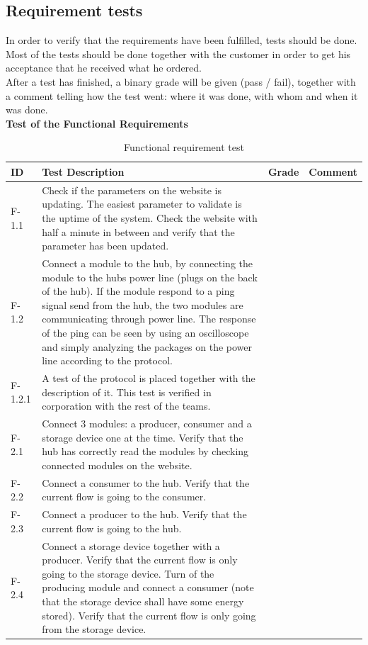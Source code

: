 \subsection{Requirement tests}
In order to verify that the requirements have been fulfilled, tests should be done. Most of the tests should be done together with the customer in order to get his acceptance that he received what he ordered. 
\\After a test has finished, a binary grade will be given (pass / fail), together with a comment telling how the test went: where it was done, with whom and when it was done.
\\[0.2cm]\textbf{Test of the Functional Requirements}
\begin{table}[H]
	\begin{tabular} [b] {| p{1.2cm} |  p{9.3cm} | p{1.2cm} | p{3.8cm} |}
	\hline
	\textbf{ID} & \textbf{Test Description} & \textbf{Grade} & \textbf{Comment} \\\hline
		F-1.1 	& Check if the parameters on the website is updating. The easiest parameter to validate is the uptime of the system. Check the website with half a minute in between and verify that the parameter has been updated. 	&	&\\ \hline
		F-1.2 	& Connect a module to the hub, by connecting the module to the hubs power line (plugs on the back of the hub). If the module respond to a ping signal send from the hub, the two modules are communicating through power line. The response of the ping can be seen by using an oscilloscope and simply analyzing the packages on the power line according to the protocol. 	&	&\\ \hline
		F-1.2.1 	& A test of the protocol is placed together with the description of it. This test is verified in corporation with the rest of the teams.	&	&\\ \hline
		F-2.1 	& Connect 3 modules: a producer, consumer and a storage device one at the time. Verify that the hub has correctly read the modules by checking connected modules on the website.	&	&\\ \hline
		F-2.2 	& Connect a consumer to the hub. Verify that the current flow is going to the consumer.	&	&\\ \hline
		F-2.3 	& Connect a producer to the hub. Verify that the current flow is going to the hub.	&	&\\ \hline
		F-2.4 	& Connect a storage device together with a producer. Verify that the current flow is only going to the storage device. Turn of the producing module and connect a consumer (note that the storage device shall have some energy stored). Verify that the current flow is only going from the storage device.	&	&\\ \hline
	\end{tabular}
	\caption{Functional requirement test}
\end{table}
